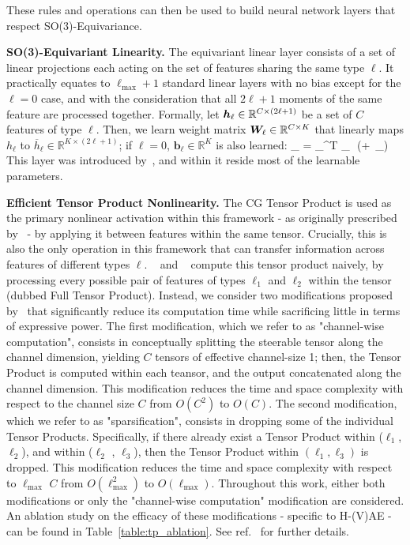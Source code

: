 These rules and operations can then be used to build neural network layers that respect
SO(3)-Equivariance.

\textbf{SO(3)-Equivariant Linearity.} The equivariant linear layer consists of a set of linear
projections each acting on the set of features sharing the same type $\ell$. It practically equates
to $\ell_{\text{max}} + 1$ standard linear layers with no bias except for the $\ell=0$ case, and
with the consideration that all $2\ell+1$ moments of the same feature are processed together.
Formally, let ${\bm{h}}_{\ell} \in \mathbb{R}^{C \times (2\ell + 1)}$ be a set of $C$ features of type
$\ell$. Then, we learn weight matrix ${\bm{W}}_{\ell} \in \mathbb{R}^{C \times K}$ that linearly maps
$h_{\ell}$ to $\overline{h}_{\ell} \in \mathbb{R}^{K \times (2\ell + 1)}$; if $\ell=0$,
$\mathbf{b}_{\ell} \in\mathbb{R}^{K}$ is also learned:
\EQ
    \overline{\vh}_{\ell} = \mW_{\ell}^{T} \vh_{\ell} \,\,(+ \,_{\ell})
    \label{eq:linearity}
\EE
This layer was introduced by~\citep{kondor_clebsch-gordan_2018}, and within it reside most of the
learnable parameters.

\textbf{Efficient Tensor Product Nonlinearity.} The CG Tensor Product is used as the primary
nonlinear activation within this framework -
as originally prescribed by~\citep{kondor_clebsch-gordan_2018} - by applying it between features
within the same tensor. Crucially, this is
also the only operation in this framework that can transfer information across features of
different types $\ell$.
~\citep{kondor_clebsch-gordan_2018} and ~\citep{pun_learning_2022} compute this tensor product
naively, by processing every possible pair of
features of types $\ell_1$ and $\ell_2$ within the tensor (dubbed Full Tensor Product).
Instead, we consider two modifications proposed by~\citep{cobb_efficient_2021} that significantly
reduce its computation time while sacrificing
little in terms of expressive power.
The first modification, which we refer to as "channel-wise computation", consists in conceptually
splitting
the steerable tensor along the channel dimension, yielding $C$ tensors of effective channel-size 1;
then, the Tensor Product is computed within
each teansor, and the output concatenated along the channel dimension. This modification reduces
the time and space complexity with respect to
the channel size $C$ from $O(C^2)$ to $O(C)$.
The second modification, which we refer to as "sparsification", consists in dropping some of the
individual Tensor Products. Specifically, if
there already exist a Tensor Product within ($\ell_1$, $\ell_2$), and within ($\ell_2$ , $\ell_3$),
then the Tensor Product within $(\ell_1, \ell_3)$
is dropped. This modification reduces the time and space complexity with respect to
$\ell_{\mathrm{max}}$ $C$ from $O(\ell_{\mathrm{max}}^2)$ to $O(\ell_{\mathrm{max}})$.
Throughout this work, either both modifications or only the "channel-wise computation" modification
are considered.
An ablation study on the efficacy of these modifications - specific to H-(V)AE - can be found in
Table~\ref{table:tp_ablation}. See ref.~\citep{cobb_efficient_2021} for further details.

